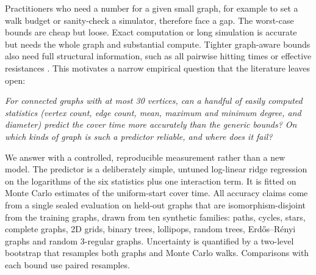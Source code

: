 \documentclass{article}
\begin{document}
Practitioners who need a number for a given small graph, for example to set a walk budget or sanity-check a simulator, therefore face a gap. The worst-case bounds are cheap but loose. Exact computation or long simulation is accurate but needs the whole graph and substantial compute. Tighter graph-aware bounds also need full structural information, such as all pairwise hitting times or effective resistances \citep{Chandra1989TheER}. This motivates a narrow empirical question that the literature leaves open:

\emph{For connected graphs with at most 30 vertices, can a handful of easily computed statistics (vertex count, edge count, mean, maximum and minimum degree, and diameter) predict the cover time more accurately than the generic bounds? On which kinds of graph is such a predictor reliable, and where does it fail?}

We answer with a controlled, reproducible measurement rather than a new model. The predictor is a deliberately simple, untuned log-linear ridge regression on the logarithms of the six statistics plus one interaction term. It is fitted on Monte Carlo estimates of the uniform-start cover time. All accuracy claims come from a single sealed evaluation on held-out graphs that are isomorphism-disjoint from the training graphs, drawn from ten synthetic families: paths, cycles, stars, complete graphs, 2D grids, binary trees, lollipops, random trees, Erd\H{o}s--R\'enyi graphs and random 3-regular graphs. Uncertainty is quantified by a two-level bootstrap that resamples both graphs and Monte Carlo walks. Comparisons with each bound use paired resamples.
\end{document}
